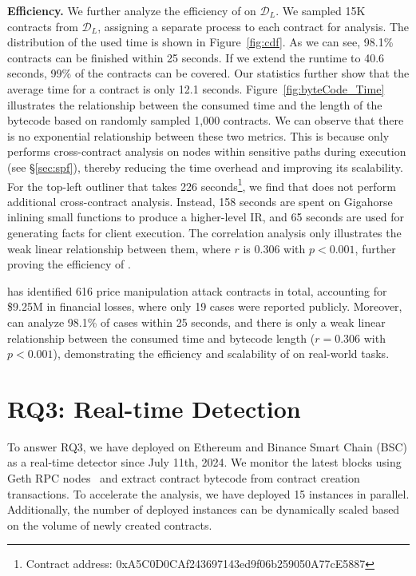 \noindent
\textbf{Efficiency.}
We further analyze the efficiency of {\tool} on $\mathcal{D}_L$. We sampled 15K contracts from $\mathcal{D}_L$, assigning a separate process to each contract for analysis. The distribution of the used time is shown in Figure~\ref{fig:cdf}. 
As we can see, 98.1\% contracts can be finished within 25 seconds. If we extend the runtime to 40.6 seconds, 99\% of the contracts can be covered.
Our statistics further show that the average time for a contract is only 12.1 seconds.
Figure~\ref{fig:byteCode_Time} illustrates the relationship between the consumed time and the length of the bytecode based on randomly sampled 1,000 contracts.
We can observe that there is no exponential relationship between these two metrics. This is because {\tool} only performs cross-contract analysis on nodes within sensitive paths during execution (see \S{\ref{sec:spf}}), thereby reducing the time overhead and improving its scalability.
For the top-left outliner that takes 226 seconds\footnote{Contract address: 0xA5C0D0CAf243697143ed9f06b259050A77cE5887}, we find that {\tool} does not perform additional cross-contract analysis. Instead, 158 seconds are spent on Gigahorse inlining small functions to produce a higher-level IR, and 65 seconds are used for generating facts for client execution.
The correlation analysis only illustrates the weak linear relationship between them, where $r$ is 0.306 with $p < 0.001$, further proving the efficiency of {\tool}.



\begin{tcolorbox}[title= Answer to RQ2, left=2pt, right=2pt, top=0.5pt,bottom=0.5pt, colback=gray!5,colframe=gray!80!black]
{\tool} has identified 616 price manipulation attack contracts in total, accounting for \$9.25M in financial losses, where only 19 cases were reported publicly.
Moreover, {\tool} can analyze 98.1\% of cases within 25 seconds, and there is only a weak linear relationship between the consumed time and bytecode length ($r = 0.306$ with $p < 0.001$), demonstrating the efficiency and scalability of {\tool} on real-world tasks.
\end{tcolorbox}


\section{RQ3: Real-time Detection}
To answer RQ3, we have deployed {\tool} on Ethereum and Binance Smart Chain (BSC) as a real-time detector since July 11th, 2024.
We monitor the latest blocks using Geth RPC nodes~\cite{geth} and extract contract bytecode from contract creation transactions. To accelerate the analysis, we have deployed 15 instances in parallel. Additionally, the number of deployed instances can be dynamically scaled based on the volume of newly created contracts.


